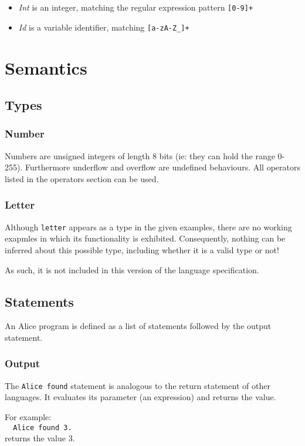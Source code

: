 \documentclass[a4wide, 11pt]{article}
\begin{document}
\begin{itemize}
\item \emph{Int} is an integer, matching the regular expression pattern \verb:[0-9]+:
\item \emph{Id} is a variable identifier, matching \verb:[a-zA-Z_]+:
\end{itemize}

\section{Semantics}
\subsection{Types}
\subsubsection{Number}
Numbers are unsigned integers of length 8 bits (ie: they can hold the range
0-255). Furthermore underflow and overflow are undefined behaviours. All
operators listed in the operators section can be used.

\subsubsection{Letter}
Although \verb:letter: appears as a type in the given examples, there are no
working exapmles in which its functionality is exhibited. Consequently, nothing
can be inferred about this possible type, including whether it is a valid type
or not!

As such, it is not included in this version of the language specification.

\subsection{Statements}
An Alice program is defined as a list of statements followed by the output
statement.

\subsubsection{Output}
The \verb:Alice found: statement is analogous to the return statement of
other languages. It evaluates its parameter (an expression) and returns the
value.

For example:\\
\verb:  Alice found 3.:\\
returns the value 3.
\end{document}
